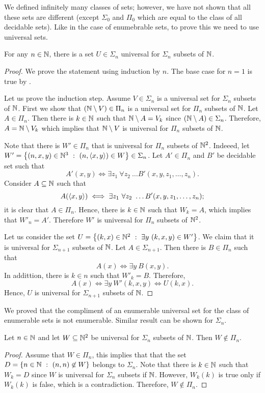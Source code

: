 We defined infinitely many classes of sets; however, we have not shown that all
these sets are different (except $\Sigma_0$ and $\Pi_0$ which are equal to the
class of all decidable sets). Like in the case of enumebrable sets, to prove
this we need to use universal sets.
\begin{theorem}
  For any $n \in {\mathbb{N}}$, there is a set $U \in \Sigma_n$ universal for $\Sigma_n$
  subsets of ${\mathbb{N}}$.
\end{theorem}
\begin{proof}
  We prove the statement using induction by $n$. The base case for $n = 1$ is
  true by
  .

  Let us prove the induction step. Assume $V \in \Sigma_n$ is a universal set
  for $\Sigma_n$ subsets of ${\mathbb{N}}$. First we show that $({\mathbb{N}} \setminus V) \in \Pi_n$
  is a universal set for $\Pi_n$ subsets of ${\mathbb{N}}$. Let $A \in \Pi_n$. Then there
  is $k \in {\mathbb{N}}$ such that ${\mathbb{N}} \setminus A = V_k$ since $({\mathbb{N}} \setminus A) \in
  \Sigma_n$. Therefore, $A = {\mathbb{N}} \setminus V_k$ which implies that 
  ${\mathbb{N}} \setminus V$ is universal for $\Pi_n$ subsets of ${\mathbb{N}}$.
  
  
  Note that there is $W' \in \Pi_n$ that is universal for $\Pi_n$ subsets
  of ${\mathbb{N}}^2$. Indeeed, let $W' = \set[(n, \pair{x}{y}) \in W]{(n, x, y) \in \N^3}
  \in \Sigma_n$.
  Let $A' \in \Pi_n$ and $B'$ be decidable set such that
  \[
    A'(x, y) \iff \exists z_1 \  \forall z_2 \  \dots B'(x, y, z_1, \dots, z_n).
  \]
  Consider $A \subseteq {\mathbb{N}}$ such that 
  \[
    A(\langle {x}, {y} \rangle) \iff \exists z_1 \  \forall z_2 \  \dots 
      B'(x, y, z_1, \dots, z_n);
  \]
  it is clear that $A \in \Pi_n$. Hence, there is $k \in {\mathbb{N}}$ such that 
  $W_k = A$, which implies that $W'_n = A'$. Therefore $W'$ is universal for
  $\Pi_n$ subsets of ${\mathbb{N}}^2$.

  Let us consider the set 
  $U = \set[\exists y \  (k, x, y) \in W']{(k, x) \in \N^2}$. We claim that it is
  universal for $\Sigma_{n + 1}$ subsets of ${\mathbb{N}}$.
  Let $A \in \Sigma_{n + 1}$. Then there is $B \in \Pi_n$ such that 
  \[
    A(x) \iff \exists y \  B(x, y).
  \]
  In addittion, there is $k \in n$ such that $W'_k = B$. Therefore, 
  \[
    A(x) \iff \exists y \  W'(k, x, y) \iff U(k, x).
  \]
  Hence, $U$ is universal for $\Sigma_{n + 1}$ subsets of ${\mathbb{N}}$.
\end{proof}

We proved that the compliment of an enumerable universal set for the class of
enumerable sets is not enumerable. Similar result can be shown for $\Sigma_n$.
\begin{theorem}
  Let $n \in {\mathbb{N}}$ and let $W \subseteq {\mathbb{N}}^2$ be universal for $\Sigma_n$ subsets
  of ${\mathbb{N}}$. Then $W \not\in \Pi_n$.
\end{theorem}
\begin{proof}
  Assume that $W \in \Pi_n$, this implies that that the set 
  $D = \set[(n, n) \not\in W]{n \in \N}$ belongs to $\Sigma_n$.
  Note that there is $k \in {\mathbb{N}}$ such that $W_k = D$ since $W$ is universal for
  $\Sigma_n$ subsets if ${\mathbb{N}}$. However, $W_k(k)$ is true only if $W_k(k)$ is
  false, which is a contradiction. Therefore, $W \not\in \Pi_n$.
\end{proof}

